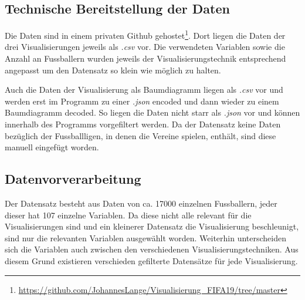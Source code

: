 \documentclass[usegeometry=true]{scrartcl}
\begin{document}
\subsection{Technische Bereitstellung der Daten}
Die Daten sind in einem privaten Github gehostet\footnote{\url{https://github.com/JohannesLange/Visualisierung_FIFA19/tree/master}}. Dort liegen die Daten der drei Visualisierungen jeweils als \textit{.csv} vor. Die verwendeten Variablen sowie die Anzahl an Fussballern wurden jeweils der Visualisierungstechnik entsprechend angepasst um den Datensatz so klein wie möglich zu halten.

Auch die Daten der Visualisierung als Baumdiagramm liegen als \textit{.csv} vor und werden erst im Programm zu einer \textit{.json} encoded und dann wieder zu einem Baumdiagramm decoded. So liegen die Daten nicht starr als \textit{.json} vor und können innerhalb des Programms vorgefiltert werden. Da der Datensatz keine Daten bezüglich der Fussballligen, in denen die Vereine spielen, enthält, sind diese manuell eingefügt worden.






\subsection{\label{Datenvorverarbeitung}Datenvorverarbeitung}

Der Datensatz besteht aus Daten von ca. 17000 einzelnen Fussballern, jeder dieser hat 107 einzelne Variablen. Da diese nicht alle relevant für die Visualisierungen sind und ein kleinerer Datensatz die Visualisierung beschleunigt, sind nur die relevanten Variablen ausgewählt worden. Weiterhin unterscheiden sich die Variablen auch zwischen den verschiedenen Visualisierungstechniken. Aus diesem Grund existieren verschieden gefilterte Datensätze für jede Visualisierung.
\end{document}
